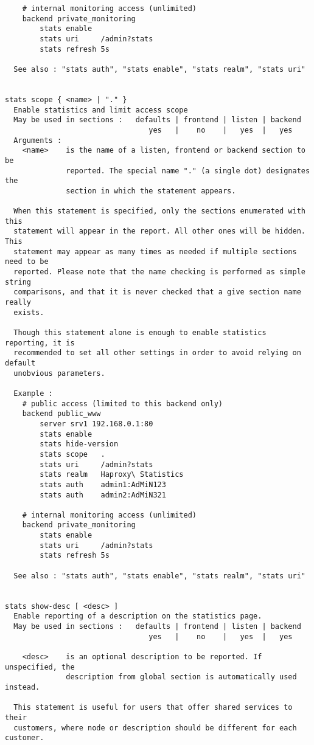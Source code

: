 \begin{verbatim}
    # internal monitoring access (unlimited)
    backend private_monitoring
        stats enable
        stats uri     /admin?stats
        stats refresh 5s

  See also : "stats auth", "stats enable", "stats realm", "stats uri"


stats scope { <name> | "." }
  Enable statistics and limit access scope
  May be used in sections :   defaults | frontend | listen | backend
                                 yes   |    no    |   yes  |   yes
  Arguments :
    <name>    is the name of a listen, frontend or backend section to be
              reported. The special name "." (a single dot) designates the
              section in which the statement appears.

  When this statement is specified, only the sections enumerated with this
  statement will appear in the report. All other ones will be hidden. This
  statement may appear as many times as needed if multiple sections need to be
  reported. Please note that the name checking is performed as simple string
  comparisons, and that it is never checked that a give section name really
  exists.

  Though this statement alone is enough to enable statistics reporting, it is
  recommended to set all other settings in order to avoid relying on default
  unobvious parameters.

  Example :
    # public access (limited to this backend only)
    backend public_www
        server srv1 192.168.0.1:80
        stats enable
        stats hide-version
        stats scope   .
        stats uri     /admin?stats
        stats realm   Haproxy\ Statistics
        stats auth    admin1:AdMiN123
        stats auth    admin2:AdMiN321

    # internal monitoring access (unlimited)
    backend private_monitoring
        stats enable
        stats uri     /admin?stats
        stats refresh 5s

  See also : "stats auth", "stats enable", "stats realm", "stats uri"


stats show-desc [ <desc> ]
  Enable reporting of a description on the statistics page.
  May be used in sections :   defaults | frontend | listen | backend
                                 yes   |    no    |   yes  |   yes

    <desc>    is an optional description to be reported. If unspecified, the
              description from global section is automatically used instead.

  This statement is useful for users that offer shared services to their
  customers, where node or description should be different for each customer.


\end{verbatim}
